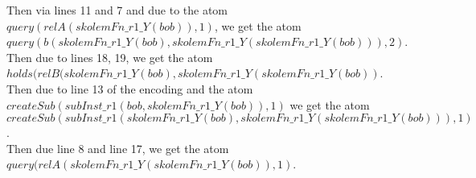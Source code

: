 \documentclass{article}
\begin{document}
Then via lines 11 and 7 and due to the atom $query(relA(skolemFn\_r1\_Y(bob)),1)$, we get the atom $query(b(skolemFn\_r1\_Y(bob), skolemFn\_r1\_Y(skolemFn\_r1\_Y(bob))),2)$. \\

Then due to lines 18, 19, we get the atom $holds(relB(skolemFn\_r1\_Y(bob), skolemFn\_r1\_Y(skolemFn\_r1\_Y(bob))$.\\

Then due to line 13 of the encoding and the atom $createSub(subInst\_r1(bob,skolemFn\_r1\_Y(bob)),1)$ we get the atom $createSub(subInst\_r1(skolemFn\_r1\_Y(bob), skolemFn\_r1\_Y(skolemFn\_r1\_Y(bob))),1)$. \\

Then due line 8 and line 17, we get the atom $query(relA(skolemFn\_r1\_Y(skolemFn\_r1\_Y(bob)),1)$.\\
\end{document}
